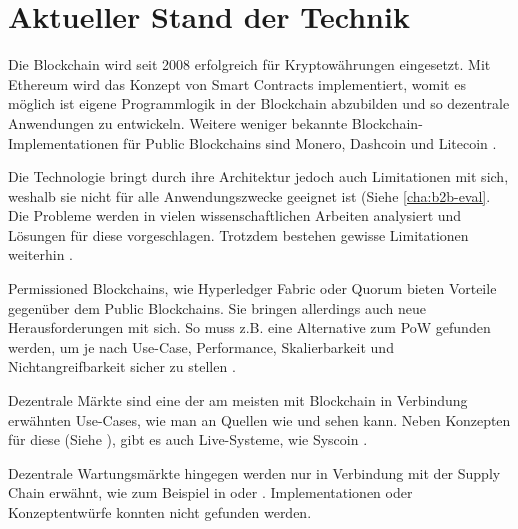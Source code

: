 \chapter{Aktueller Stand der Technik}
\label{cha:stand-technik}

Die Blockchain wird seit 2008 erfolgreich für Kryptowährungen eingesetzt. Mit Ethereum wird das Konzept von Smart Contracts implementiert, womit es möglich ist eigene Programmlogik in der Blockchain abzubilden und so dezentrale Anwendungen zu entwickeln. Weitere weniger bekannte Blockchain-Implementationen für Public Blockchains sind Monero, Dashcoin und Litecoin \cite{BlockchainHubBlockchainsDistributedLedger}. 

Die Technologie bringt durch ihre Architektur jedoch auch Limitationen mit sich, weshalb sie nicht für alle Anwendungszwecke geeignet ist (Siehe \ref{cha:b2b-eval}. Die Probleme werden in vielen wissenschaftlichen Arbeiten analysiert und Lösungen für diese vorgeschlagen. Trotzdem bestehen gewisse Limitationen weiterhin \cite{ZhengBlockchainChallengesOpportunities2017}\cite{SwanBlockchainblueprintnew2015}\cite{SchererPerformanceScalabilityBlockchain2017}.

Permissioned Blockchains, wie Hyperledger Fabric oder Quorum bieten Vorteile gegenüber dem Public Blockchains. Sie bringen allerdings auch neue Herausforderungen mit sich. So muss z.B. eine Alternative zum PoW gefunden werden, um je nach Use-Case, Performance, Skalierbarkeit und Nichtangreifbarkeit sicher zu stellen \cite{LiScalablePrivateIndustrial2017}.

Dezentrale Märkte sind eine der am meisten mit Blockchain in Verbindung erwähnten Use-Cases, wie man an Quellen wie \cite{BenHamidaBlockchainEnterpriseOverview2017} und \cite{RavalDecentralizedApplicationsHarnessing2016} sehen kann.
Neben Konzepten für diese (Siehe \cite{KaiserDecentralizedPrivateMarketplace}), gibt es auch Live-Systeme, wie Syscoin \cite{SidhuSyscoinPeertoPeerElectronic2017}.

Dezentrale Wartungsmärkte hingegen werden nur in Verbindung mit der Supply Chain erwähnt, wie zum Beispiel in \cite{SoldatosWhatDoesBlockchain2017} oder \cite{GotzeLufthansaIndustrySolutions}. Implementationen oder Konzeptentwürfe konnten nicht gefunden werden.




